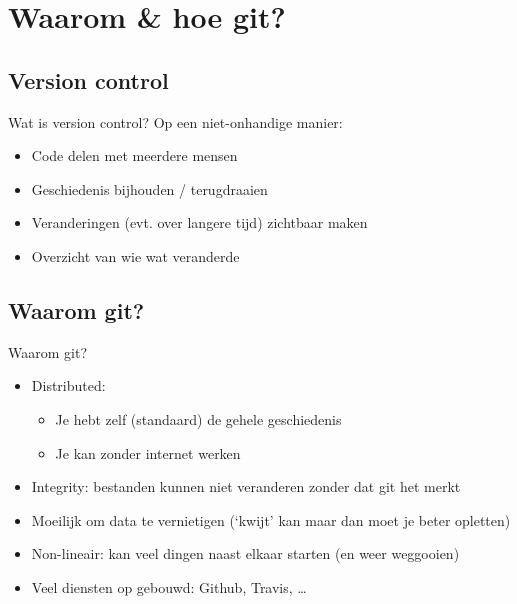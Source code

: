 \section{Waarom \& hoe git?}

\subsection{Version control}
\begin{frame}{Wat is version control?}
	Op een niet-onhandige manier:
		\begin{itemize}
			\item Code delen met meerdere mensen
			\item Geschiedenis bijhouden / terugdraaien
			\item Veranderingen (evt. over langere tijd) zichtbaar maken
			\item Overzicht van wie wat veranderde
		\end{itemize}
\end{frame}

\subsection{Waarom git?}
\begin{frame}{Waarom git?}
	\begin{itemize}
		\item Distributed:
			\begin{itemize}
				\item Je hebt zelf (standaard) de gehele geschiedenis
				\item Je kan zonder internet werken
			\end{itemize}
		\item Integrity: bestanden kunnen niet veranderen zonder dat git het merkt
		\item Moeilijk om data te vernietigen (`kwijt' kan maar dan moet je beter opletten)
		\item Non-lineair: kan veel dingen naast elkaar starten (en weer weggooien)
		\item Veel diensten op gebouwd: Github, Travis, \ldots
	\end{itemize}
\end{frame}

